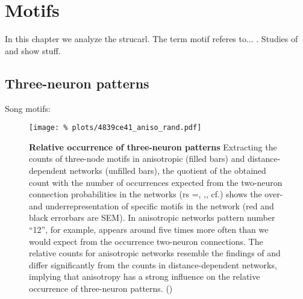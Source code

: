 

\section{Motifs}

In this chapter we analyze the strucarl. The term motif referes
to... . Studies of \textcite{Song2005} and \textcite{Perin2011} show
stuff.

\subsection*{Three-neuron patterns}

Song motifs:


\begin{figure}[H]
  \centering
  \texttt{[image: \%
    plots/4839ce41\_aniso\_rand.pdf]} 
  \captionsetup{skip=8pt}
  \caption{\textbf{Relative occurrence of three-neuron patterns}
    Extracting the counts of three-node motifs in anisotropic (filled
    bars) and distance-dependent networks (unfilled bars), the
    quotient of the obtained count with the number of occurrences
    expected from the two-neuron connection probabilities in the
    networks (rs =, ,, cf.) shows the over- and underrepresentation of
    specific motifs in the network (red and black errorbars are
    SEM). In anisotropic networks pattern number \enquote{12}, for
    example, appears around five times more often than we would expect
    from the occurrence two-neuron connections. The relative counts
    for anisotropic networks resemble the findings of
    \textcite{Song2005} and differ significantly from the counts in
    distance-dependent networks, implying that anisotropy has a strong
    influence on the relative occurrence of three-neuron
    patterns. () }
  \label{fig:distance_theory_compare}
\end{figure}



